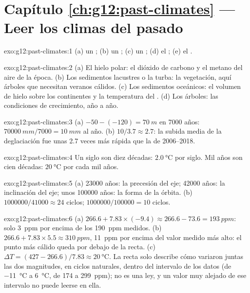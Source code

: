 \section*{Capítulo \ref{ch:g12:past-climates} --- Leer los climas del pasado}

\begin{solution}{exo:g12:past-climates:1}
(a) un ; (b) un ; (c) un ; (d) el ;
(e) el .
\end{solution}

\begin{solution}{exo:g12:past-climates:2}
(a) El hielo polar: el dióxido de carbono y el metano del aire de la época.
(b) Los sedimentos lacustres o la turba: la vegetación, aquí árboles que necesitan veranos
cálidos. (c) Los sedimentos oceánicos: el volumen de hielo sobre los continentes y la temperatura
del . (d) Los árboles: las condiciones de crecimiento, año a año.
\end{solution}

\begin{solution}{exo:g12:past-climates:3}
(a) $-50 - (-120) = \qty{70}{m}$ en \num{7000} años: $\qty{70000}{mm}/\num{7000}
= \qty{10}{mm}$ al año. (b) $10/3.7 \approx 2.7$: la subida media de la
deglaciación fue unas 2.7 veces más rápida que la de 2006--2018.
\end{solution}

\begin{solution}{exo:g12:past-climates:4}
Un siglo son diez décadas: $\qty{2.0}{\degreeCelsius}$ por siglo. Mil
años son cien décadas: $\qty{20}{\degreeCelsius}$ por cada mil años.
\end{solution}

\begin{solution}{exo:g12:past-climates:5}
(a) \num{23000} años: la precesión del eje; \num{42000} años: la
inclinación del eje; unos \num{100000} años: la forma de la órbita.
(b) $\num{1000000}/\num{41000} \approx 24$ ciclos; $\num{1000000}/\num{100000}
= 10$ ciclos.
\end{solution}

\begin{solution}{exo:g12:past-climates:6}
(a) $266.6 + 7.83 \times (-9.4) \approx 266.6 - 73.6 = \qty{193}{ppm}$: solo
\qty{3}{ppm} por encima de los \qty{190}{ppm} medidos. (b) $266.6 + 7.83 \times 5.5
\approx \qty{310}{ppm}$, \qty{11}{ppm} por encima del valor medido más alto: el
punto más cálido queda por debajo de la recta. (c) $\Delta T = (427 - 266.6)/7.83 \approx
\qty{20}{\degreeCelsius}$. La recta solo describe cómo variaron juntas las dos magnitudes,
en ciclos naturales, dentro del intervalo de los datos
(de \qty{-11}{\degreeCelsius} a \qty{+6}{\degreeCelsius}, de 174 a
\qty{299}{ppm}); no es una ley, y un valor muy alejado de ese intervalo no puede
leerse en ella.
\end{solution}

